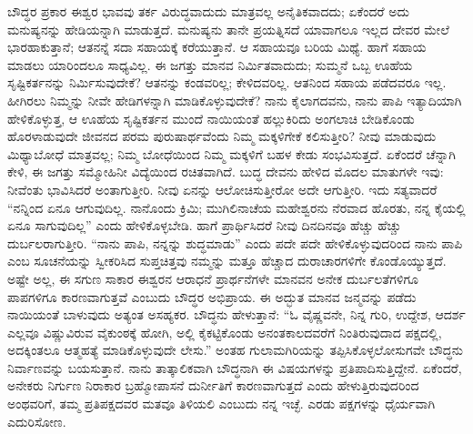 ಬೌದ್ಧರ ಪ್ರಕಾರ ಈಶ್ವರ ಭಾವವು ತರ್ಕ ವಿರುದ್ಧವಾದುದು ಮಾತ್ರವಲ್ಲ ಅನೈತಿಕವಾದದು; ಏಕೆಂದರೆ ಅದು ಮನುಷ್ಯನನ್ನು ಹೇಡಿಯನ್ನಾಗಿ ಮಾಡುತ್ತದೆ. ಮನುಷ್ಯನು ತಾನೇ ಪ್ರಯತ್ನಿಸದೆ ಯಾವಾಗಲೂ ಇಲ್ಲದ ದೇವರ ಮೇಲೆ ಭಾರಹಾಕುತ್ತಾನೆ; ಆತನನ್ನೆ ಸದಾ ಸಹಾಯಕ್ಕೆ ಕರೆಯುತ್ತಾನೆ. ಆ ಸಹಾಯವೂ ಬರಿಯ ಮಿಥ್ಯೆ. ಹಾಗೆ ಸಹಾಯ ಮಾಡಲು ಯಾರಿಂದಲೂ ಸಾಧ್ಯವಿಲ್ಲ. ಈ ಜಗತ್ತು ಮಾನವ ನಿರ್ಮಿತವಾದುದು; ಸುಮ್ಮನೆ ಒಬ್ಬ ಊಹೆಯ ಸೃಷ್ಟಿಕರ್ತನನ್ನು ನಿರ್ಮಿಸುವುದೇಕೆ? ಆತನನ್ನು ಕಂಡವರಿಲ್ಲ; ಕೇಳಿದವರಿಲ್ಲ. ಆತನಿಂದ ಸಹಾಯ ಪಡೆದವರೂ ಇಲ್ಲ. ಹೀಗಿರಲು ನಿಮ್ಮನ್ನು ನೀವೇ ಹೇಡಿಗಳನ್ನಾಗಿ ಮಾಡಿಕೊಳ್ಳುವುದೇಕೆ? ನಾನು ಕೈಲಾಗದವನು, ನಾನು ಪಾಪಿ ಇತ್ಯಾದಿಯಾಗಿ ಹೇಳಿಕೊಳ್ಳುತ್ತ, ಆ ಊಹೆಯ ಸೃಷ್ಟಿಕರ್ತನ ಮುಂದೆ ನಾಯಿಯಂತೆ ಹಲ್ಲುಕಿರಿದು ಅಂಗಲಾಚಿ ಬೇಡಿಕೊಂಡು ಹೊರಳಾಡುವುದೇ ಜೀವನದ ಪರಮ ಪುರುಷಾರ್ಥವೆಂದು ನಿಮ್ಮ ಮಕ್ಕಳಿಗೇಕೆ ಕಲಿಸುತ್ತೀರಿ? ನೀವು ಮಾಡುವುದು ಮಿಥ್ಯಾಬೋಧೆ ಮಾತ್ರವಲ್ಲ; ನಿಮ್ಮ ಬೋಧೆಯಿಂದ ನಿಮ್ಮ ಮಕ್ಕಳಿಗೆ ಬಹಳ ಕೇಡು ಸಂಭವಿಸುತ್ತದೆ. ಏಕೆಂದರೆ ಚೆನ್ನಾಗಿ ಕೇಳಿ, ಈ ಜಗತ್ತು ಸಮ್ಮೋಹಿನೀ ವಿದ್ಯೆಯಿಂದ ರಚಿತವಾಗಿದೆ. ಬುದ್ಧ ದೇವನು ಹೇಳಿದ ಮೊದಲ ಮಾತುಗಳೇ ಇವು: ನೀವೆಂತು ಭಾವಿಸಿದರೆ ಅಂತಾಗುತ್ತೀರಿ. ನೀವು ಏನನ್ನು ಆಲೋಚಿಸುತ್ತೀರೋ ಅದೇ ಆಗುತ್ತೀರಿ. ಇದು ಸತ್ಯವಾದರೆ “ನನ್ನಿಂದ ಏನೂ ಆಗುವುದಿಲ್ಲ. ನಾನೊಂದು ಕ್ರಿಮಿ; ಮುಗಿಲಿನಾಚೆಯ ಮಹೇಶ್ವರನು ನೆರವಾದ ಹೊರತು, ನನ್ನ ಕೈಯಲ್ಲಿ ಏನೂ ಸಾಗುವುದಿಲ್ಲ” ಎಂದು ಹೇಳಿಕೊಳ್ಳಬೇಡಿ. ಹಾಗೆ ಪ್ರಾರ್ಥಿಸಿದರೆ ನೀವು ದಿನದಿನವೂ ಹೆಚ್ಚು ಹೆಚ್ಚು ದುರ್ಬಲರಾಗುತ್ತೀರಿ. “ನಾನು ಪಾಪಿ, ನನ್ನನ್ನು ಶುದ್ಧಮಾಡು” ಎಂದು ಪದೇ ಪದೇ ಹೇಳಿಕೊಳ್ಳುವುದರಿಂದ ನಾನು ಪಾಪಿ ಎಂಬ ಸೂಚನೆಯನ್ನು ಸ್ವೀಕರಿಸಿದ ಸುಪ್ತಚಿತ್ತವು ನಮ್ಮನ್ನು ಮತ್ತೂ ಹೆಚ್ಚಾದ ದುರಾಚಾರಗಳಿಗೇ ಕೊಂಡೊಯ್ಯುತ್ತದೆ. ಅಷ್ಟೇ ಅಲ್ಲ, ಈ ಸಗುಣ ಸಾಕಾರ ಈಶ್ವರನ ಆರಾಧನೆ ಪ್ರಾರ್ಥನೆಗಳೇ ಮಾನವನ ಅನೇಕ ದುರ್ಬಲತೆಗಳಿಗೂ ಪಾಪಗಳಿಗೂ ಕಾರಣವಾಗುತ್ತವೆ ಎಂಬುದು ಬೌದ್ಧರ ಅಭಿಪ್ರಾಯ. ಈ ಅದ್ಭುತ ಮಾನವ ಜನ್ಮವನ್ನು ಪಡೆದು ನಾಯಿಯಂತೆ ಬಾಳುವುದು ಅತ್ಯಂತ ಅಸಹ್ಯಕರ. ಬೌದ್ಧನು ಹೇಳುತ್ತಾನೆ: “ಓ ವೈಷ್ಣವನೇ, ನಿನ್ನ ಗುರಿ, ಉದ್ದೇಶ, ಆದರ್ಶ ಎಲ್ಲವೂ ವಿಷ್ಣುವಿರುವ ವೈಕುಂಠಕ್ಕೆ ಹೋಗಿ, ಅಲ್ಲಿ ಕೈಕಟ್ಟಿಕೊಂಡು ಅನಂತಕಾಲದವರೆಗೆ ನಿಂತಿರುವುದಾದ ಪಕ್ಷದಲ್ಲಿ, ಅದಕ್ಕಿಂತಲೂ ಆತ್ಮಹತ್ಯೆ ಮಾಡಿಕೊಳ್ಳುವುದೇ ಲೇಸು.” ಅಂತಹ ಗುಲಾಮಗಿರಿಯನ್ನು ತಪ್ಪಿಸಿಕೊಳ್ಳಲೋಸುಗವೇ ಬೌದ್ಧನು ನಿರ್ವಾಣವನ್ನು ಬಯಸುತ್ತಾನೆ. ನಾನು ತಾತ್ಕಾಲಿಕವಾಗಿ ಬೌದ್ಧನಾಗಿ ಈ ವಿಷಯಗಳನ್ನು ಪ್ರತಿಪಾದಿಸುತ್ತಿದ್ದೇನೆ. ಏಕೆಂದರೆ, ಅನೇಕರು ನಿರ್ಗುಣ ನಿರಾಕಾರ ಬ್ರಹ್ಮೋಪಾಸನೆ ದುರ್ನೀತಿಗೆ ಕಾರಣವಾಗುತ್ತದೆ ಎಂದು ಹೇಳುತ್ತಿರುವುದರಿಂದ ಅಂಥವರಿಗೆ, ತಮ್ಮ ಪ್ರತಿಪಕ್ಷದವರ ಮತವೂ ತಿಳಿಯಲಿ ಎಂಬುದು ನನ್ನ ಇಚ್ಛೆ. ಎರಡು ಪಕ್ಷಗಳನ್ನು ಧೈರ್ಯವಾಗಿ ಎದುರಿಸೋಣ.

